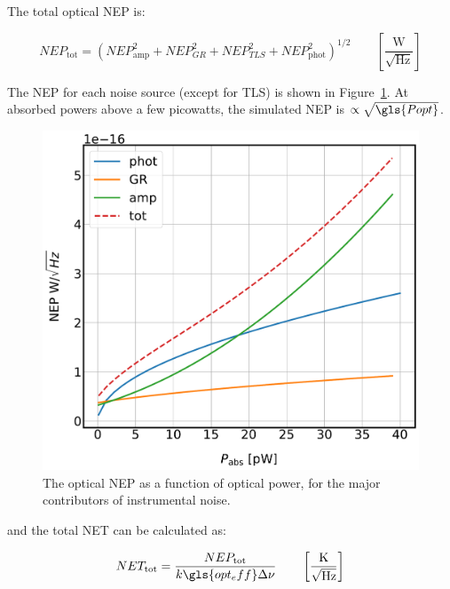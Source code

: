 The total optical NEP is:

\begin{equation} \label{eq:NEP tot}
  NEP_{\mathrm{tot}} = \left( NEP_{\mathrm{amp}}^{2} + NEP_{GR}^{2} + NEP_{TLS}^{2} + NEP_{\mathrm{phot}}^{2} \right)^{1/2} \qquad \left[ \frac{\mathrm{W}}{\sqrt{\mathrm{Hz}}} \right]
\end{equation}

The NEP for each noise source (except for TLS) is shown in Figure~\ref{fig:NEP_tot}. At absorbed powers above a few picowatts, the simulated NEP is $\propto \sqrt{\gls{Popt}}$.

\begin{figure}[!htbp]
\centering
\includegraphics[width=\textwidth]{figures/kid_model/NEP}
\caption[The optical NEP as a function of optical power, for the major contributors of instrumental noise.]{The optical NEP as a function of optical power, for the major contributors of instrumental noise.}
\label{fig:NEP_tot}
\end{figure}

and the total NET can be calculated as:

\begin{equation} \label{eq:NET tot}
  NET_{\mathrm{tot}} = \frac{NEP_{\mathrm{tot}}}{k\gls{opt_eff}\Delta\nu} \qquad \left[ \frac{\mathrm{K}}{\sqrt{\mathrm{Hz}}} \right]
\end{equation}


